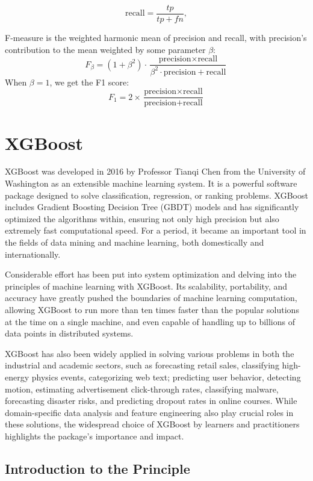 \documentclass[12pt]{article}
\begin{document}
\[
\text{recall} = \frac{tp}{tp + fn},
\]


F-measure is the weighted harmonic mean of precision and recall, with precision’s contribution to the mean weighted by some parameter $\beta$:
\[
F_{\beta} = (1 + \beta^2) \cdot \frac{\text{precision} \times \text{recall}}{\beta^2 \cdot \text{precision} + \text{recall}}
\]
When $\beta = 1$, we get the F1 score:
\[
F_1 = 2 \times \frac{\text{precision} \times \text{recall}}{\text{precision} + \text{recall}}
\]


\section{XGBoost}

XGBoost was developed in 2016 by Professor Tianqi Chen from the University of Washington as an extensible machine learning system. It is a powerful software package designed to solve classification, regression, or ranking problems. XGBoost includes Gradient Boosting Decision Tree (GBDT) models and has significantly optimized the algorithms within, ensuring not only high precision but also extremely fast computational speed. For a period, it became an important tool in the fields of data mining and machine learning, both domestically and internationally.

Considerable effort has been put into system optimization and delving into the principles of machine learning with XGBoost. Its scalability, portability, and accuracy have greatly pushed the boundaries of machine learning computation, allowing XGBoost to run more than ten times faster than the popular solutions at the time on a single machine, and even capable of handling up to billions of data points in distributed systems.

XGBoost has also been widely applied in solving various problems in both the industrial and academic sectors, such as forecasting retail sales, classifying high-energy physics events, categorizing web text; predicting user behavior, detecting motion, estimating advertisement click-through rates, classifying malware, forecasting disaster risks, and predicting dropout rates in online courses. While domain-specific data analysis and feature engineering also play crucial roles in these solutions, the widespread choice of XGBoost by learners and practitioners highlights the package's importance and impact.



\subsection{Introduction to the Principle}
\end{document}
